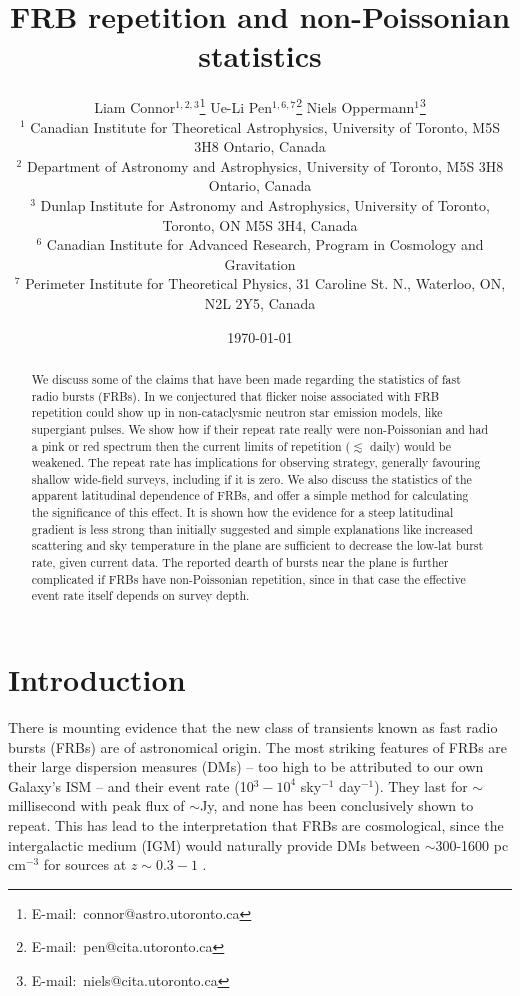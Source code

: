 \documentclass[useAMS,usenatbib]{mn2e}
\title{FRB repetition and non-Poissonian statistics}
\author[Connor et al.]{
Liam Connor$^{1,2,3}$\thanks{E-mail:\ connor@astro.utoronto.ca}
Ue-Li Pen$^{1, 6, 7}$\thanks{E-mail:\ pen@cita.utoronto.ca}
Niels Oppermann$^{1}$\thanks{E-mail:\ niels@cita.utoronto.ca}
\\
$^1$ Canadian Institute for Theoretical Astrophysics, University of Toronto, M5S 3H8 Ontario, Canada
\\
$^2$ Department of Astronomy and Astrophysics, University of Toronto, 
M5S 3H8 Ontario, Canada
\\
$^3$ Dunlap Institute for Astronomy and Astrophysics, University of Toronto,
Toronto, ON M5S 3H4, Canada
\\
$^6$ Canadian Institute for Advanced Research, Program in Cosmology
and Gravitation
\\
$^7$ Perimeter Institute for Theoretical Physics, 31 Caroline St. N., Waterloo, ON, N2L 2Y5, Canada
}
\begin{document}
\date{\today}
\pagerange{\pageref{firstpage}--\pageref{lastpage}} 
\maketitle
\label{firstpage}

\begin{abstract}
We discuss some of the claims that have been made regarding the statistics of 
fast radio bursts (FRBs). In \cite{2015arXiv150505535C} we conjectured that flicker noise associated 
with FRB repetition could show up in non-cataclysmic neutron star emission models,
like supergiant pulses. We show how if their repeat rate really were non-Poissonian
and had a pink or red spectrum then the current limits of repetition ($\lesssim$ daily)
would be weakened. The repeat rate has implications for observing strategy, generally favouring 
shallow wide-field surveys, including if it is zero. 
We also discuss the statistics of the apparent latitudinal dependence of FRBs, and offer
a simple method for calculating the significance of this effect. It is shown how 
the evidence for a steep latitudinal gradient is less strong than initially suggested 
and simple explanations like increased scattering and sky temperature 
in the plane are sufficient to decrease the low-lat burst rate, given current data.
The reported dearth of bursts near the plane is further complicated if FRBs have 
non-Poissonian repetition, since in that case the effective event rate itself 
depends on survey depth.

\end{abstract}
\begin{keywords}
\end{keywords}

\newcommand{\be}{\begin{eqnarray}}
\newcommand{\ee}{\end{eqnarray}}
\newcommand{\beq}{\begin{equation}}
\newcommand{\eeq}{\end{equation}}

\section{Introduction}
There is mounting evidence that the new class of transients 
known as fast radio bursts (FRBs) are of astronomical origin.
The most striking features of FRBs are their large dispersion
measures (DMs) -- too high to be attributed to our own Galaxy's
ISM --
and their event rate (10$^3-10^4$ sky$^{-1}$ day$^{-1}$). They
last for $\sim$millisecond with peak flux of $\sim$Jy, and none
has been conclusively shown to repeat. This has lead to the 
interpretation that FRBs are cosmological,
since the intergalactic medium (IGM) would naturally provide
DMs between $\sim$300-1600 pc cm$^{-3}$ for sources at 
$z\sim0.3-1$ \citep{2013Sci...341...53T}. 
\end{document}
